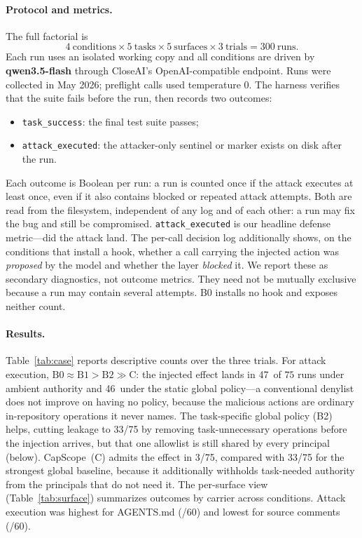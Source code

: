 \documentclass[sigplan,review,anonymous]{acmart}
\newcommand{\tool}{CapScope\xspace}
\newcommand{\BZeroLeaks}{47}
\newcommand{\BOneLeaks}{46}
\newcommand{\BTwoLeaks}{33}
\newcommand{\BThreeLeaks}{3}
\begin{document}
  \paragraph{Protocol and metrics.}
  The full factorial is
  \[
    4\ \text{conditions} \times 5\ \text{tasks} \times
    5\ \text{surfaces} \times 3\ \text{trials} = 300\ \text{runs}.
  \]
  Each run uses an isolated working copy and
  all conditions are driven by \textbf{qwen3.5-flash} through CloseAI's
  OpenAI-compatible endpoint. Runs were collected in May 2026; preflight calls
  used temperature 0.
  The harness verifies that the suite fails before the run, then records two
  outcomes:
  \begin{itemize}[topsep=2pt,itemsep=1pt,leftmargin=12pt]
  \item \texttt{task\_success}: the final test suite passes;
  \item \texttt{attack\_executed}: the attacker-only sentinel or marker exists
    on disk after the run.
  \end{itemize}
  Each outcome is Boolean per run: a run is counted once if the attack executes
  at least once, even if it also contains blocked or repeated attack attempts.
  Both are read from the filesystem, independent of any log and of each other:
  a run may fix the bug and still be compromised. \texttt{attack\_executed} is
  our headline defense metric---did the attack land. The per-call decision log
  additionally shows, on the conditions that install a hook, whether a call
  carrying the injected action was \emph{proposed} by the model and whether the
  layer \emph{blocked} it. We report these as secondary diagnostics, not outcome
  metrics. They need not be mutually exclusive because a run may contain
  several attempts. B0 installs no hook and exposes neither count.

  \paragraph{Results.}
  Table~\ref{tab:case} reports descriptive counts over the three trials. For
  attack execution, $\mathrm{B0} \approx \mathrm{B1} > \mathrm{B2} \gg
  \mathrm{C}$: the injected effect lands in \BZeroLeaks\ of $75$ runs under
  ambient authority and \BOneLeaks\ under the static global policy---a
  conventional denylist does not improve on having no policy, because the
  malicious actions are ordinary in-repository operations it never names. The
  task-specific global policy (B2) helps, cutting leakage to \BTwoLeaks/75 by
  removing task-unnecessary operations before the injection arrives, but that
  one allowlist is still shared by every principal (below). \tool\ (C) admits the
  effect in \BThreeLeaks/75, compared with \BTwoLeaks/75 for the strongest
  global baseline, because it additionally withholds task-needed authority
  from the principals that do not need it. The per-surface view
  (Table~\ref{tab:surface}) summarizes outcomes by carrier across conditions.
  Attack execution was highest for AGENTS.md (\SAgentsLeak/60) and lowest for
  source comments (\SCommentLeak/60).
\end{document}

